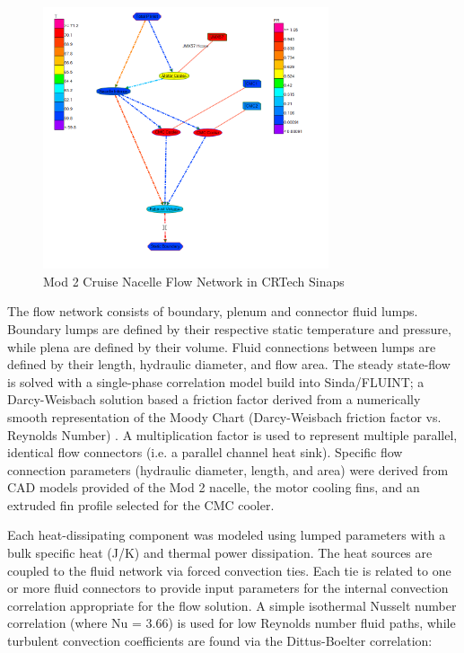 \documentclass[]{aiaa-tc}%
\begin{document}
\begin{figure}[!htb]%
	\centering
	\includegraphics[width=0.75\textwidth]{figures/sinaps_paramsweep.PNG}
	\caption{Mod 2 Cruise Nacelle Flow Network in CRTech Sinaps}
	\label{fig:Sinaps}
\end{figure}

The flow network consists of boundary, plenum and connector fluid lumps.  Boundary lumps are defined by their respective static temperature and pressure, while plena are defined by their volume.  Fluid connections between lumps are defined by their length, hydraulic diameter, and flow area.  The steady state-flow is solved with a single-phase correlation model build into Sinda/FLUINT; a Darcy-Weisbach solution based a friction factor derived from a numerically smooth representation of the Moody Chart  (Darcy-Weisbach friction factor vs. Reynolds Number) \cite{CRtech_2013}.  A multiplication factor is used to represent multiple parallel, identical flow connectors (i.e. a parallel channel heat sink).  Specific flow connection parameters (hydraulic diameter, length, and area) were derived from CAD models provided of the Mod 2 nacelle, the motor cooling fins, and an extruded fin profile selected for the CMC cooler.  

Each heat-dissipating component was modeled using lumped parameters with a bulk specific heat (J/K) and thermal power dissipation.  The heat sources are coupled to the fluid network via forced convection ties.  Each tie is related to one or more fluid connectors to provide input parameters for the internal convection correlation appropriate for the flow solution.  A simple isothermal Nusselt number correlation (where Nu = 3.66) is used for low Reynolds number fluid paths, while turbulent convection coefficients are found via the Dittus-Boelter correlation\cite{CRtech_2015}:  
\end{document}
